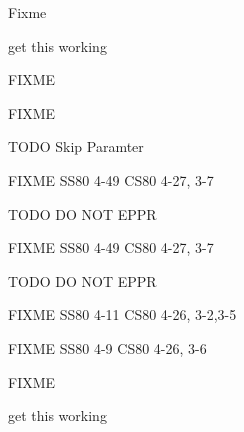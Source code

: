 \begin{DoxyRefList}
Fixme  
\item[\label{todo__todo000022}%
\hypertarget{todo__todo000022}{}%
Global \hyperlink{ss80_8h_af50a313d8234d38511925a0ca5a9a8a3}{S\+S80\+\_\+\+Test} (void)]get this working  
\item[\label{todo__todo000046}%
\hypertarget{todo__todo000046}{}%
Global \hyperlink{ss80_8h_a00d10ca5d1cb70d035927df06e90d36c}{S\+S80\+\_\+\+Transparent\+\_\+\+State} (void)]F\+I\+X\+ME 

F\+I\+X\+ME 

T\+O\+DO Skip Paramter 

F\+I\+X\+ME S\+S80 4-\/49 C\+S80 4-\/27, 3-\/7 

T\+O\+DO DO N\+OT E\+P\+PR 

F\+I\+X\+ME S\+S80 4-\/49 C\+S80 4-\/27, 3-\/7 

T\+O\+DO DO N\+OT E\+P\+PR 

F\+I\+X\+ME S\+S80 4-\/11 C\+S80 4-\/26, 3-\/2,3-\/5 

F\+I\+X\+ME S\+S80 4-\/9 C\+S80 4-\/26, 3-\/6  
\item[\label{todo__todo000059}%
\hypertarget{todo__todo000059}{}%
Global \hyperlink{ss80_8h_ac8a4c5dcd550e896c1e7cec68d2f70e5}{S\+S80\+\_\+\+Universal\+\_\+\+Device\+\_\+\+Clear} (void)]F\+I\+X\+ME  
\item[\label{todo__todo000021}%
\hypertarget{todo__todo000021}{}%
Global \hyperlink{ss80_8c_a239f4cd0f1360dbfd90fa043d1323e67}{TD} \mbox{[}\mbox{]}]get this working 
\end{DoxyRefList}